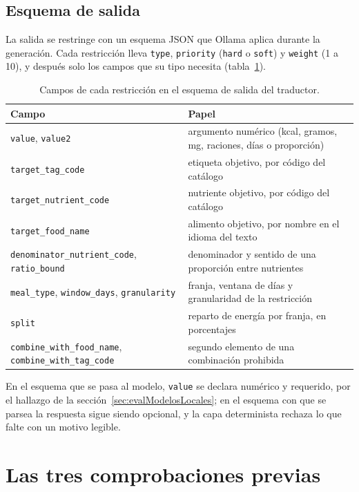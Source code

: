 \subsection*{Esquema de salida}

La salida se restringe con un esquema JSON que Ollama aplica durante la generación. Cada restricción lleva \texttt{type}, \texttt{priority} (\texttt{hard} o \texttt{soft}) y \texttt{weight} (1 a 10), y después solo los campos que su tipo necesita (tabla~\ref{tab:anexoEsquemaTraductor}).

\begin{table}[htbp]
\centering
\small
\begin{tabular}{|p{5.4cm}|p{7.6cm}|}
\hline
\textbf{Campo} & \textbf{Papel} \\
\hline
\texttt{value}, \texttt{value2} & argumento numérico (kcal, gramos, mg, raciones, días o proporción) \\
\hline
\texttt{target\_tag\_code} & etiqueta objetivo, por código del catálogo \\
\hline
\texttt{target\_nutrient\_code} & nutriente objetivo, por código del catálogo \\
\hline
\texttt{target\_food\_name} & alimento objetivo, por nombre en el idioma del texto \\
\hline
\texttt{denominator\_nutrient\_code}, \texttt{ratio\_bound} & denominador y sentido de una proporción entre nutrientes \\
\hline
\texttt{meal\_type}, \texttt{window\_days}, \texttt{granularity} & franja, ventana de días y granularidad de la restricción \\
\hline
\texttt{split} & reparto de energía por franja, en porcentajes \\
\hline
\texttt{combine\_with\_food\_name}, \texttt{combine\_with\_tag\_code} & segundo elemento de una combinación prohibida \\
\hline
\end{tabular}
\caption{Campos de cada restricción en el esquema de salida del traductor.}
\label{tab:anexoEsquemaTraductor}
\end{table}

En el esquema que se pasa al modelo, \texttt{value} se declara numérico y requerido, por el hallazgo de la sección~\ref{sec:evalModelosLocales}; en el esquema con que se parsea la respuesta sigue siendo opcional, y la capa determinista rechaza lo que falte con un motivo legible.

\section{Las tres comprobaciones previas}
\label{sec:anexoPromptsPrechecks}

